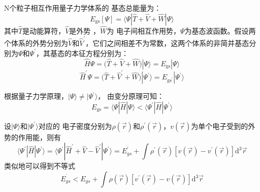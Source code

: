 N个粒子相互作用量子力学体系的%
{基态总能量}为：
\begin{equation}
	{E_{\mathrm{gs}}[\Psi]}%
=\langle\Psi%
|\hat{T}+\hat{V}+\hat{W}|\Psi%
\rangle
	\label{eq:DFT_01}
\end{equation}
其中$\hat{T}$是动能算符，$\hat{V}$是外势%
，$\hat{W}$为%
{电}子间相互作用势{，$\Psi$为基态波函数}。假设两个体系的外势分别为$\hat{V}$和$\hat V^{\prime}$，它们之间相差不为常数，这两个体系的非简并基态分别为$\Psi$和$\Psi^{\prime}$，其基态的本征方程分别为：
$${\hat H\Psi=}\bigl(\hat{T}+\hat{V}+\hat{W}\bigr)|\Psi\rangle=E_{\mathrm{gs}}|\Psi\rangle$$
$${\hat H^{\prime}\Psi=}\bigl(\hat{T}+\hat V^{\prime}+\hat{W}\bigr)|\Psi^{\prime}\rangle=E_{\mathrm{gs}^{\prime}}|\Psi^{\prime}\rangle$$

{根据量子力学原理，}$|\Psi\rangle{\neq}|\Psi^{\prime}\rangle$，%
由变分原理可知：
$$E_{\mathrm{gs}}=\langle\Psi|\hat{H}|\Psi\rangle<\langle\Psi^{\prime}|\hat{H}|\Psi^{\prime}\rangle$$

设$|\Psi\rangle$和$|\Psi^{\prime}\rangle$对应的%
{电}子密度分别为$\rho(\vec{r})
$和$\rho^{\prime}(\vec{r})$，{$v(\vec r)$为单个电子受到的外势的作用能，则}有
$$\langle\Psi^{\prime}|\hat{H}|\Psi^{\prime}\rangle=\langle\Psi^{\prime}|\hat H^{\prime}+\hat{V}-\hat V^{\prime}|\Psi^{\prime}\rangle=E^{\prime}_{gs}+\int{\rho^{\prime}(\vec{r})[v(\vec{r})-v^{\prime}(\vec{r})]\textrm{d}^3\vec{r}}$$
{类似地}可以得到不等式
$$E^{^{\prime}}_{gs}<E_{gs}+\int{\rho(\vec{r})[v^{\prime}(\vec{r})-v(\vec{r})]\textrm{d}^{3}\vec{r}}$$

